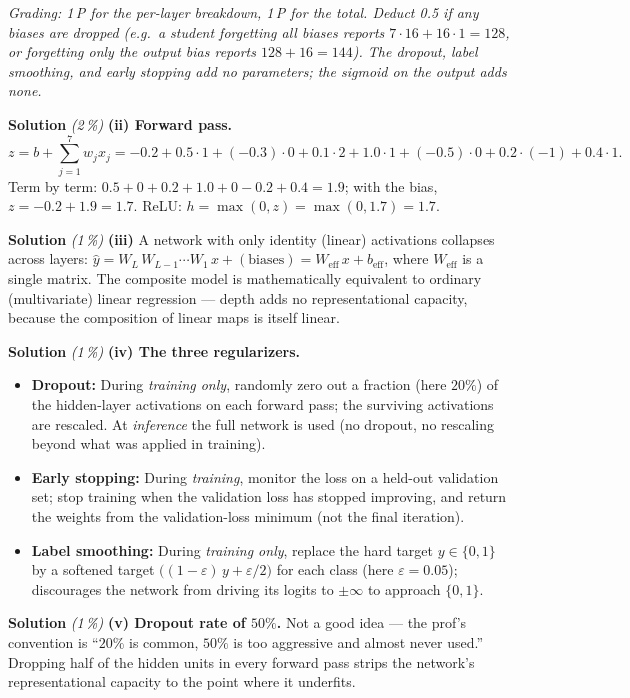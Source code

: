 \documentclass[11pt,a4paper]{article}
\newcommand{\subpoints}[1]{\textit{(#1\,\%)}}
\newcommand{\sol}{\noindent\textbf{Solution}}
\begin{document}
\noindent\emph{Grading: 1\,P for the per-layer breakdown, 1\,P for the total. Deduct 0.5 if any
biases are dropped (e.g.\ a student forgetting all biases reports $7\cdot 16 + 16\cdot 1 = 128$,
or forgetting only the output bias reports $128+16=144$). The dropout, label smoothing, and early
stopping add \emph{no} parameters; the sigmoid on the output adds none.}

\medskip
\sol{} \subpoints{2} \textbf{(ii) Forward pass.}
$$z = b + \sum_{j=1}^{7} w_j x_j
   = -0.2 + 0.5\cdot 1 + (-0.3)\cdot 0 + 0.1\cdot 2 + 1.0\cdot 1 + (-0.5)\cdot 0 + 0.2\cdot(-1) + 0.4\cdot 1.$$
Term by term: $0.5 + 0 + 0.2 + 1.0 + 0 - 0.2 + 0.4 = 1.9$; with the bias, $z = -0.2 + 1.9 = \boxed{1.7}$.
ReLU: $h = \max(0, z) = \max(0, 1.7) = \boxed{1.7}$.

\medskip
\sol{} \subpoints{1} \textbf{(iii)} A network with only identity (linear) activations collapses
across layers: $\hat y = W_L\,W_{L-1}\cdots W_1\, x + (\text{biases}) = W_{\mathrm{eff}}\,x + b_{\mathrm{eff}}$,
where $W_{\mathrm{eff}}$ is a single matrix. The composite model is mathematically equivalent to
ordinary (multivariate) linear regression --- depth adds no representational capacity, because the
composition of linear maps is itself linear.

\medskip
\sol{} \subpoints{1} \textbf{(iv) The three regularizers.}
\begin{itemize}
  \item \textbf{Dropout:} During \emph{training only}, randomly zero out a fraction (here $20\%$)
        of the hidden-layer activations on each forward pass; the surviving activations are
        rescaled. At \emph{inference} the full network is used (no dropout, no rescaling beyond
        what was applied in training).
  \item \textbf{Early stopping:} During \emph{training}, monitor the loss on a held-out validation
        set; stop training when the validation loss has stopped improving, and return the weights
        from the validation-loss minimum (not the final iteration).
  \item \textbf{Label smoothing:} During \emph{training only}, replace the hard target $y\in\{0,1\}$
        by a softened target $\bigl((1-\varepsilon)\,y + \varepsilon/2\bigr)$ for each class (here
        $\varepsilon=0.05$); discourages the network from driving its logits to $\pm\infty$ to
        approach $\{0,1\}$.
\end{itemize}

\medskip
\sol{} \subpoints{1} \textbf{(v) Dropout rate of $50\%$.} Not a good idea --- the prof's convention
is ``$20\%$ is common, $50\%$ is too aggressive and almost never used.'' Dropping half of the
hidden units in every forward pass strips the network's representational capacity to the point
where it underfits.
\end{document}
